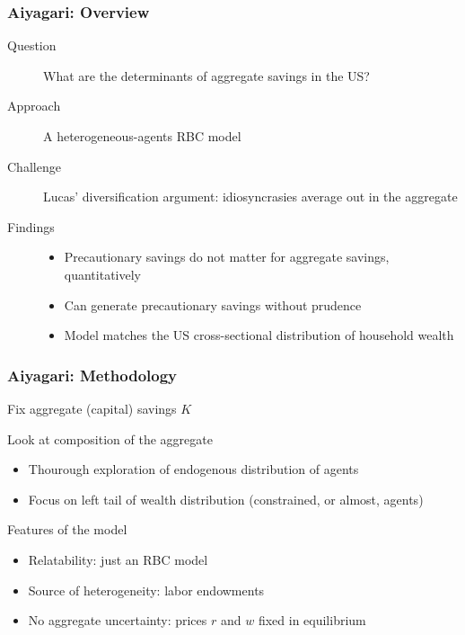 \documentclass[10pt, aspectratio=1610, natbib, handout]{beamer}
\begin{document}
  \begin{frame}
    \frametitle{Aiyagari: Overview}

    \begin{description}
      \item[Question] What are the determinants of aggregate savings in the US?
      \vfill\pause
      \item[Approach] A heterogeneous-agents RBC model
      \vfill\pause
      \item[Challenge] Lucas' diversification argument: idiosyncrasies average out in the aggregate
      \vfill\pause
      \item[Findings]
        \begin{itemize}
          \item Precautionary savings do not matter for aggregate savings, quantitatively
          \item Can generate precautionary savings without prudence
          \item Model matches the US cross-sectional distribution of household wealth
        \end{itemize}
    \end{description}

  \end{frame}

  \begin{frame}
    \frametitle{Aiyagari: Methodology}

    Fix aggregate (capital) savings $K$

    \vfill\pause

    Look at composition of the aggregate
    \begin{itemize}
      \item Thourough exploration of endogenous distribution of agents
      \item Focus on left tail of wealth distribution (constrained, or almost, agents)
    \end{itemize}

    \vfill\pause

    Features of the model
    \begin{itemize}
      \item Relatability: just an RBC model
      \item Source of heterogeneity: labor endowments
      \item No aggregate uncertainty: prices $r$ and $w$ fixed in equilibrium
    \end{itemize}

  \end{frame}
\end{document}
